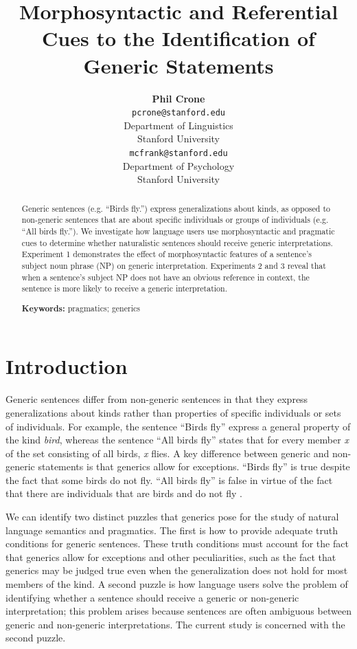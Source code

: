 \documentclass[10pt,letterpaper]{article}
\title{Morphosyntactic and Referential Cues to the Identification of Generic Statements}
\author{{\large \bf Phil Crone} \\
	\texttt{pcrone@stanford.edu}\\
  Department of Linguistics \\
  Stanford University
  \And {\large \bf Michael C. Frank} \\
  \texttt{mcfrank@stanford.edu}\\
  Department of Psychology \\
  Stanford University}
\begin{document}
\maketitle


\begin{abstract}
Generic sentences (e.g. ``Birds fly.'') express generalizations about kinds, as opposed to non-generic sentences that are about specific individuals or groups of individuals (e.g. ``All birds fly.''). We investigate how language users use morphosyntactic and pragmatic cues to determine whether naturalistic sentences should receive generic interpretations. Experiment 1 demonstrates the effect of morphosyntactic features of a sentence's subject noun phrase (NP) on generic interpretation. Experiments 2 and 3 reveal that when a sentence's subject NP does not have an obvious reference in context, the sentence is more likely to receive a generic interpretation. 

\textbf{Keywords:} pragmatics; generics
\end{abstract}


\section{Introduction}

Generic sentences differ from non-generic sentences in that they express generalizations about kinds rather than properties of specific individuals or sets of individuals. For example, the sentence ``Birds fly'' express a general property of the kind \textit{bird}, whereas the sentence ``All birds fly'' states that for every member \textit{x} of the set consisting of all birds, \textit{x} flies. A key difference between generic and non-generic statements is that generics allow for exceptions. ``Birds fly'' is true despite the fact that some birds do not fly. ``All birds fly'' is false in virtue of the fact that there are individuals that are birds and do not fly \cite{Prasada:2000}. 

We can identify two distinct puzzles that generics pose for the study of natural language semantics and pragmatics. The first is how to provide adequate truth conditions for generic sentences. These truth conditions must account for the fact that generics allow for exceptions and other peculiarities, such as the fact that generics may be judged true even when the generalization does not hold for most members of the kind. A second puzzle is how language users solve the problem of identifying whether a sentence should receive a generic or non-generic interpretation; this problem arises because sentences are often ambiguous between generic and non-generic interpretations. The current study is concerned with the second puzzle.
\end{document}
